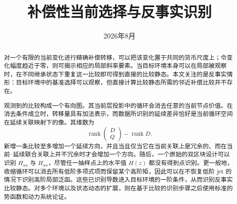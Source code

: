 \documentclass[UTF8,11pt]{ctexart}
\title{补偿性当前选择与反事实识别}
\author{}
\date{2026年8月}
\theoremstyle{definition}
\begin{document}
\maketitle

\begin{abstract}
对一个有限的当前变化进行精确补偿转移，可以把该变化置于共同的货币尺度上；令变化幅度趋近于零，则可揭示相应的局部斜率要素。当目标环境本身可以在局部被观察时，在不同继承状态下重复这一比较即可得到直接的比较静态。本文关注的是反事实情形：目标环境中的基准选择可以观察，但直接计算比较静态所需的邻近补偿比较并不存在。

观测到的比较构成一个有向图。其当前层投影中的循环会消去任意的当前节点价值。在消去条件成立时，转移量具有加法表示，而数据所识别的延续差异恰好是当前循环空间在延续关联映射下的像。其维数为
\[
\operatorname{rank}\!\begin{pmatrix}D\\Q\end{pmatrix}-\operatorname{rank}D.
\]
新增一条比较至多增加一个延续方向，并且当且仅当它在当前关联上是冗余的、而在当前--延续联合关联上并不冗余时才会增加一个方向。随后，一个原始的双区块设计可以识别 $H_{xa}$ 与 $H_{xx}$，尽管任一抽样点上的水平值 $H(z)$ 都没有得到点识别。更一般地，收缩循环可以消去所有低阶多项式项而保留某个高阶矩，因此可以在不恢复低阶 jet 的情况下识别高阶局部泛函。这些已识别导数进入目标环境的一阶条件，从而识别反事实比较静态。对多个环境以及状态动态的扩展，则在基于比较的识别步骤之后使用标准的势函数和动力系统论证。
\end{abstract}
















\end{document}
